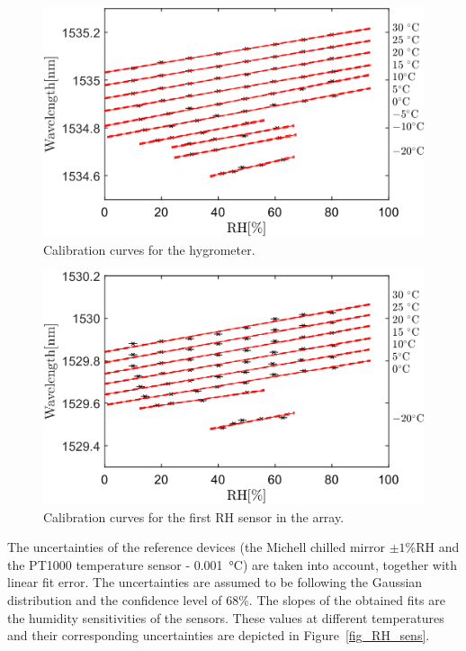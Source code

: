 \begin{figure}[!h]
\centering
\includegraphics[width=0.67\columnwidth]{Chapter5/images/RHS.png}
\caption{Calibration curves for the hygrometer.}
\label{fig_single_calibration}
\end{figure}

\begin{figure}[!h]
\centering
\includegraphics[width=0.67\columnwidth]{Chapter5/images/RH1.png}
\caption{Calibration curves for the first \gls{RH} sensor in the array.}
\label{fig_array_calibration}
\end{figure}
The uncertainties of the reference devices (the Michell chilled mirror $\pm 1$\%RH and the PT1000 temperature sensor - \SI{0.001}{\celsius}) are taken into account, together with linear fit error. The uncertainties are assumed to be following the Gaussian distribution and the confidence level of 68\%. The slopes of the obtained fits are the humidity sensitivities of the sensors. These values at different temperatures and their corresponding uncertainties are depicted in Figure~\ref{fig_RH_sens}. 

